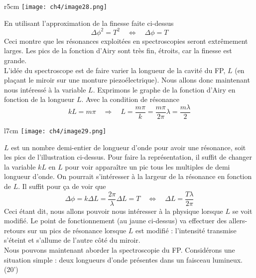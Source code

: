 	\begin{wrapfigure}[8]{r}{5cm}
	\vspace{-8mm}
	\texttt{[image: ch4/image28.png]}
	\end{wrapfigure}
En utilisant l'approximation de la finesse faite ci-dessus
\begin{equation}
\Delta\phi^2 = T^2\quad\Leftrightarrow\quad \Delta\phi = T
\end{equation}
Ceci montre que les résonances exploitées en spectroscopies seront extrêmement larges. Les pics de 
la fonction d'Airy sont très fin, étroits, car la finesse est grande.\\

L'idée du spectroscope est de faire varier la longueur de la cavité du FP, $L$ (en plaçant le miroir 
sur une monture piezoélectrique). Nous allons donc maintenant nous intéressé à la variable $L$. Exprimons 
le graphe de la fonction d'Airy en fonction de la longueur $L$. Avec la condition de résonance 
\begin{equation}
kL = m\pi\quad\Rightarrow\quad L=\frac{m\pi}{k} = \frac{m\pi}{2\pi}\lambda=\frac{m\lambda}{2}
\end{equation}

	\begin{wrapfigure}[9]{l}{7cm}
	\vspace{-8mm}
	\texttt{[image: ch4/image29.png]}
	\end{wrapfigure}
$L$ est un nombre demi-entier de longueur d'onde pour avoir une résonance, soit les pics de l'illustration 
ci-dessus. Pour faire la représentation, il suffit de changer la variable $kL$ en $L$ pour voir 
apparaître un pic tous les multiples de demi longueur d'onde. On pourrait s'intéresser à la largeur de la 
résonance en fonction de $L$. Il suffit pour ça de voir que
\begin{equation}
\Delta\phi = k\Delta L = \frac{2\pi}{\lambda}\Delta L = T\quad\Leftrightarrow\quad \Delta L = \frac{T\lambda}{
2\pi}
\end{equation}
Ceci étant dit, nous allons pouvoir nous intéresser à la physique lorsque $L$ se voit modifié. Le point 
de fonctionnement (au jaune ci-dessus) va effectuer des allers-retours sur un pics de résonance lorsque 
$L$ est modifié : l'intensité transmise s’éteint et s'allume de l'autre côté du miroir.\\

Nous pouvons maintenant aborder la spectroscopie du FP. Considérons une situation simple : deux longueurs 
d'onde présentes dans un faisceau lumineux. (20')
































